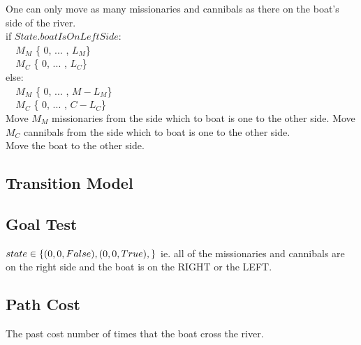 \documentclass{article}
\begin{document}
    
    
\noindent    
One can only move as many missionaries and cannibals as there on the boat's side of the river.\\
\hfill \break
\noindent  
\verb||if $State.boatIsOnLeftSide$:\\
\verb|  |$M_M$ \in \{ 0, ... ,  $L_M$\}\\
\verb|  |$M_C$ \in \{ 0, ... ,  $L_C$\}\\
\verb||else:\\
\verb|  |$M_M$ \in \{ 0, ... ,  $M-L_M$\}\\
\verb|  |$M_C$ \in \{ 0, ... ,  $C-L_C$\}\\
\hfill \break
    \noindent
    Move $M_M$ missionaries from the side which to boat is one to the other side.
    Move $M_C$ cannibals from the side which to boat is one to the other side.\\
    Move the  boat to the other side.\\
    
    
    
    
    
    
\subsection{Transition Model}
\subsection{Goal Test}
    $state \in \{ (0,0, False), (0,0, True),\}\\ $
    ie. all of the missionaries and cannibals are on the right side and the boat is on the RIGHT or the LEFT.
    
\subsection{Path Cost}
    The past cost number of times that the boat cross the river.
    
\end{document}
